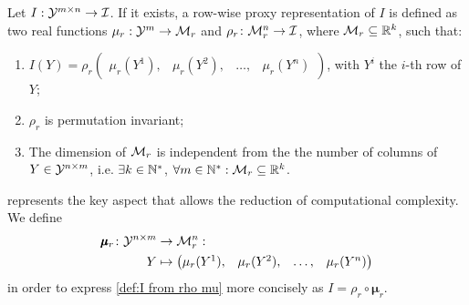 \begin{appendices}
\begin{definition}
Let $I: \mathcal{Y}^{m\times n} \to \mathcal{I}$.
If it exists, a row-wise proxy representation of $I$ is defined as two real functions $\mu_r : \mathcal{Y}^{m} \to \mathcal{M}_r$ and $\rho_r \colon \mathcal{M}^n_r \to \mathcal{I}$, where $\mathcal{M}_r \subseteq \mathbb{R}^k$, such that:
%
\begin{enumerate}[label=\arabic*., ref=\thedefinition{} item \arabic*]
    \item \label{def:I from rho mu} $I(Y) = \rho_r \begin{pmatrix} \mu_r(Y^{1}), & \mu_r(Y^{2}), &\dots, & \mu_r(Y^{n})\end{pmatrix}$, with $Y^{i}$ the $i$-th row of $Y$;
    \item $\rho_r$ is permutation invariant;
    \item\label{def:compression} The dimension of $\mathcal{M}_r$ is independent from the the number of columns of $Y \in \mathcal{Y}^{n \times m}$, i.e. %
    $\exists k\in \mathbb{N}^\ast$, $\forall m \in \mathbb{N}^\ast: \mathcal{M}_r \subseteq \mathbb{R}^k$.
\end{enumerate}
\end{definition}
%
 represents the key aspect that allows the reduction of computational complexity.
We define
\begin{align*}
    \pmb{\mu}_r \colon \mathcal{Y}^{n \times m} & \to \mathcal{M}^n_r:
    \\
    Y & \mapsto \begin{pmatrix} \mu_r(Y^{1}), & \mu_r(Y^{2}), &\dots, & \mu_r(Y^{n})\end{pmatrix}
\end{align*}
%
in order to express \cref{def:I from rho mu} more concisely as $I = \rho_r \circ \pmb{\mu}_r$.


\end{appendices}
